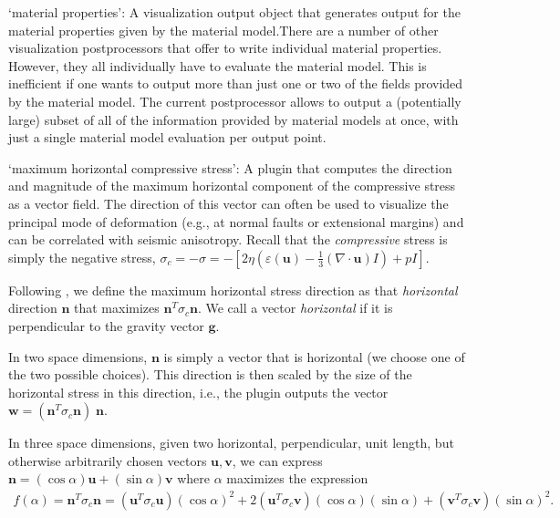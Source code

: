 \begin{itemize}
`material properties': A visualization output object that generates output for the material properties given by the material model.There are a number of other visualization postprocessors that offer to write individual material properties. However, they all individually have to evaluate the material model. This is inefficient if one wants to output more than just one or two of the fields provided by the material model. The current postprocessor allows to output a (potentially large) subset of all of the information provided by material models at once, with just a single material model evaluation per output point.

`maximum horizontal compressive stress': A plugin that computes the direction and magnitude of the maximum horizontal component of the compressive stress as a vector field. The direction of this vector can often be used to visualize the principal mode of deformation (e.g., at normal faults or extensional margins) and can be correlated with seismic anisotropy. Recall that the \textit{compressive} stress is simply the negative stress, $\sigma_c=-\sigma=-\left[     2\eta (\varepsilon(\mathbf u)             - \frac 13 (\nabla \cdot \mathbf u) I)     + pI\right]$.

Following \cite{LundTownend07}, we define the maximum horizontal stress direction as that \textit{horizontal} direction $\mathbf n$ that maximizes $\mathbf n^T \sigma_c \mathbf n$. We call a vector \textit{horizontal} if it is perpendicular to the gravity vector $\mathbf g$.

In two space dimensions, $\mathbf n$ is simply a vector that is horizontal (we choose one of the two possible choices). This direction is then scaled by the size of the horizontal stress in this direction, i.e., the plugin outputs the vector $\mathbf w = (\mathbf n^T \sigma_c \mathbf n) \; \mathbf n$.

In three space dimensions, given two horizontal, perpendicular, unit length, but otherwise arbitrarily chosen vectors $\mathbf u,\mathbf v$, we can express $\mathbf n = (\cos \alpha)\mathbf u + (\sin\alpha)\mathbf v$ where $\alpha$ maximizes the expression \begin{align*}  f(\alpha) = \mathbf n^T \sigma_c \mathbf n  = (\mathbf u^T \sigma_c \mathbf u)(\cos\alpha)^2    +2(\mathbf u^T \sigma_c \mathbf v)(\cos\alpha)(\sin\alpha)    +(\mathbf v^T \sigma_c \mathbf v)(\sin\alpha)^2.\end{align*}


\end{itemize}

